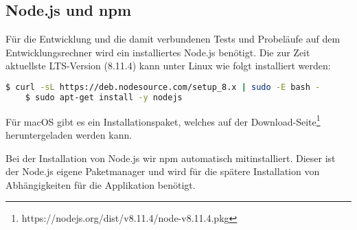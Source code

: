 \subsection{Node.js und npm}
Für die Entwicklung und die damit verbundenen Tests und Probeläufe auf dem Entwicklungsrechner wird ein installiertes
Node.js benötigt. Die zur Zeit aktuellste LTS-Version (8.11.4) kann unter Linux wie folgt installiert werden:

\begin{lstlisting}[language=bash, caption=Installation von Node.js, label=Installation von Node.js]
    $ curl -sL https://deb.nodesource.com/setup_8.x | sudo -E bash -
    $ sudo apt-get install -y nodejs
\end{lstlisting}

Für macOS gibt es ein Installationspaket, welches auf der Download-Seite\footnote{https://nodejs.org/dist/v8.11.4/node-v8.11.4.pkg}
heruntergeladen werden kann.

Bei der Installation von Node.js wir npm automatisch mitinstalliert. Dieser ist der Node.js eigene Paketmanager und wird
für die spätere Installation von Abhängigkeiten für die Applikation benötigt.